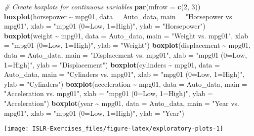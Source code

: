 \documentclass[
]{article}
\newenvironment{Shaded}{\begin{snugshade}}{\end{snugshade}}
\newcommand{\AttributeTok}[1]{\textcolor[rgb]{0.13,0.29,0.53}{#1}}
\newcommand{\CommentTok}[1]{\textcolor[rgb]{0.56,0.35,0.01}{\textit{#1}}}
\newcommand{\DecValTok}[1]{\textcolor[rgb]{0.00,0.00,0.81}{#1}}
\newcommand{\FunctionTok}[1]{\textcolor[rgb]{0.13,0.29,0.53}{\textbf{#1}}}
\newcommand{\NormalTok}[1]{#1}
\newcommand{\SpecialCharTok}[1]{\textcolor[rgb]{0.81,0.36,0.00}{\textbf{#1}}}
\newcommand{\StringTok}[1]{\textcolor[rgb]{0.31,0.60,0.02}{#1}}
\begin{document}
\begin{Shaded}
\begin{Highlighting}[]
\CommentTok{\# Create boxplots for continuous variables}
\FunctionTok{par}\NormalTok{(}\AttributeTok{mfrow =} \FunctionTok{c}\NormalTok{(}\DecValTok{2}\NormalTok{, }\DecValTok{3}\NormalTok{))}
\FunctionTok{boxplot}\NormalTok{(horsepower }\SpecialCharTok{\textasciitilde{}}\NormalTok{ mpg01, }\AttributeTok{data =}\NormalTok{ Auto\_data, }\AttributeTok{main =} \StringTok{"Horsepower vs. mpg01"}\NormalTok{, }
        \AttributeTok{xlab =} \StringTok{"mpg01 (0=Low, 1=High)"}\NormalTok{, }\AttributeTok{ylab =} \StringTok{"Horsepower"}\NormalTok{)}
\FunctionTok{boxplot}\NormalTok{(weight }\SpecialCharTok{\textasciitilde{}}\NormalTok{ mpg01, }\AttributeTok{data =}\NormalTok{ Auto\_data, }\AttributeTok{main =} \StringTok{"Weight vs. mpg01"}\NormalTok{,}
        \AttributeTok{xlab =} \StringTok{"mpg01 (0=Low, 1=High)"}\NormalTok{, }\AttributeTok{ylab =} \StringTok{"Weight"}\NormalTok{)}
\FunctionTok{boxplot}\NormalTok{(displacement }\SpecialCharTok{\textasciitilde{}}\NormalTok{ mpg01, }\AttributeTok{data =}\NormalTok{ Auto\_data, }\AttributeTok{main =} \StringTok{"Displacement vs. mpg01"}\NormalTok{,}
        \AttributeTok{xlab =} \StringTok{"mpg01 (0=Low, 1=High)"}\NormalTok{, }\AttributeTok{ylab =} \StringTok{"Displacement"}\NormalTok{)}
\FunctionTok{boxplot}\NormalTok{(cylinders }\SpecialCharTok{\textasciitilde{}}\NormalTok{ mpg01, }\AttributeTok{data =}\NormalTok{ Auto\_data, }\AttributeTok{main =} \StringTok{"Cylinders vs. mpg01"}\NormalTok{,}
        \AttributeTok{xlab =} \StringTok{"mpg01 (0=Low, 1=High)"}\NormalTok{, }\AttributeTok{ylab =} \StringTok{"Cylinders"}\NormalTok{)}
\FunctionTok{boxplot}\NormalTok{(acceleration }\SpecialCharTok{\textasciitilde{}}\NormalTok{ mpg01, }\AttributeTok{data =}\NormalTok{ Auto\_data, }\AttributeTok{main =} \StringTok{"Acceleration vs. mpg01"}\NormalTok{,}
        \AttributeTok{xlab =} \StringTok{"mpg01 (0=Low, 1=High)"}\NormalTok{, }\AttributeTok{ylab =} \StringTok{"Acceleration"}\NormalTok{)}
\FunctionTok{boxplot}\NormalTok{(year }\SpecialCharTok{\textasciitilde{}}\NormalTok{ mpg01, }\AttributeTok{data =}\NormalTok{ Auto\_data, }\AttributeTok{main =} \StringTok{"Year vs. mpg01"}\NormalTok{,}
        \AttributeTok{xlab =} \StringTok{"mpg01 (0=Low, 1=High)"}\NormalTok{, }\AttributeTok{ylab =} \StringTok{"Year"}\NormalTok{)}
\end{Highlighting}
\end{Shaded}

\begin{center}\texttt{[image: ISLR-Exercises\_files/figure-latex/exploratory-plots-1]} \end{center}
\end{document}
